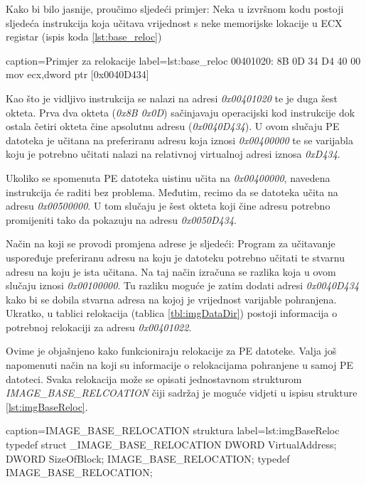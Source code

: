 \documentclass[times, utf8, diplomski, numeric]{fer}
\begin{document}
Kako bi bilo jasnije, proučimo sljedeći primjer: Neka u izvršnom
kodu postoji sljedeća instrukcija koja učitava vrijednost s neke
memorijske lokacije u ECX registar (ispis koda \ref{lst:base_reloc})

\begin{ispis} {caption=Primjer za relokacije} {label=lst:base_reloc}
00401020: 8B 0D 34 D4 40 00  mov ecx,dword ptr [0x0040D434]
\end{ispis}

Kao što je vidljivo instrukcija se nalazi na adresi
\emph{0x00401020} te je duga šest okteta. Prva dva okteta 
(\emph{0x8B 0x0D}) sačinjavaju operacijski kod instrukcije dok
ostala četiri okteta čine apsolutnu adresu (\emph{0x0040D434}). U
ovom slučaju PE datoteka je učitana na preferiranu adresu koja
iznosi \emph{0x00400000} te se varijabla koju je potrebno učitati
nalazi na relativnoj virtualnoj adresi iznosa \emph{0xD434}.

Ukoliko se spomenuta PE datoteka uistinu učita na
\emph{0x00400000}, navedena instrukcija će raditi bez problema.
Međutim, recimo da se datoteka učita na adresu \emph{0x00500000}.
U tom slučaju je šest okteta koji čine adresu potrebno
promijeniti tako da pokazuju na adresu \emph{0x0050D434}.

Način na koji se provodi promjena adrese je sljedeći: Program za
učitavanje uspoređuje preferiranu adresu na koju je datoteku
potrebno učitati te stvarnu adresu na koju je ista učitana. Na
taj način izračuna se razlika koja u ovom slučaju iznosi
\emph{0x00100000}. Tu razliku moguće je zatim dodati adresi
\emph{0x0040D434} kako bi se dobila stvarna adresa na kojoj je
vrijednost varijable pohranjena. Ukratko, u tablici relokacija 
(tablica \ref{tbl:imgDataDir}) postoji informacija o potrebnoj
relokaciji za adresu \emph{0x00401022}.

Ovime je objašnjeno kako funkcioniraju relokacije za PE datoteke.
Valja još napomenuti način na koji su informacije o relokacijama
pohranjene u samoj PE datoteci. Svaka relokacija može se opisati
jednostavnom strukturom \emph{IMAGE\_BASE\_RELCOATION} čiji
sadržaj je moguće vidjeti u ispisu strukture \ref{lst:imgBaseReloc}.

\begin{struktura} {caption=IMAGE\_BASE\_RELOCATION struktura} {label=lst:imgBaseReloc}
typedef struct _IMAGE_BASE_RELOCATION {
    DWORD   VirtualAddress;
    DWORD   SizeOfBlock;
} IMAGE_BASE_RELOCATION;
typedef IMAGE_BASE_RELOCATION;
\end{struktura}
\end{document}
